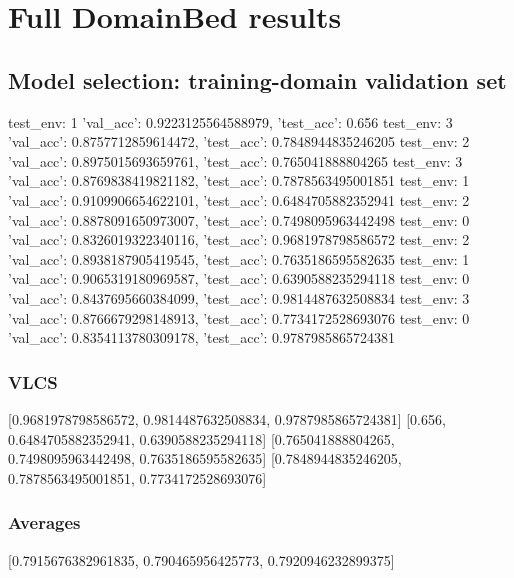 \documentclass{article}
\begin{document}
\section{Full DomainBed results}

\subsection{Model selection: training-domain validation set}
test_env: 1
{'val_acc': 0.9223125564588979, 'test_acc': 0.656}
test_env: 3
{'val_acc': 0.8757712859614472, 'test_acc': 0.7848944835246205}
test_env: 2
{'val_acc': 0.8975015693659761, 'test_acc': 0.765041888804265}
test_env: 3
{'val_acc': 0.8769838419821182, 'test_acc': 0.7878563495001851}
test_env: 1
{'val_acc': 0.9109906654622101, 'test_acc': 0.6484705882352941}
test_env: 2
{'val_acc': 0.8878091650973007, 'test_acc': 0.7498095963442498}
test_env: 0
{'val_acc': 0.8326019322340116, 'test_acc': 0.9681978798586572}
test_env: 2
{'val_acc': 0.8938187905419545, 'test_acc': 0.7635186595582635}
test_env: 1
{'val_acc': 0.9065319180969587, 'test_acc': 0.6390588235294118}
test_env: 0
{'val_acc': 0.8437695660384099, 'test_acc': 0.9814487632508834}
test_env: 3
{'val_acc': 0.8766679298148913, 'test_acc': 0.7734172528693076}
test_env: 0
{'val_acc': 0.8354113780309178, 'test_acc': 0.9787985865724381}

\subsubsection{VLCS}
[0.9681978798586572, 0.9814487632508834, 0.9787985865724381]
[0.656, 0.6484705882352941, 0.6390588235294118]
[0.765041888804265, 0.7498095963442498, 0.7635186595582635]
[0.7848944835246205, 0.7878563495001851, 0.7734172528693076]

\begin{center}
\end{center}

\subsubsection{Averages}
[0.7915676382961835, 0.790465956425773, 0.7920946232899375]

\begin{center}
\end{center}
\end{document}
